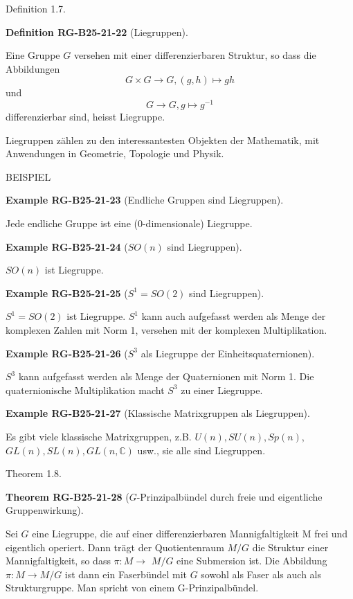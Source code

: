 \documentclass[10pt, letterpaper]{article}
\newcommand{\CustomHeading}[3]{%
  \par\medskip\noindent%
  \textbf{#1 #2} \textnormal{(#3)}.\enskip%
}
\newenvironment{DEF}[2]{\begin{unitbox}\CustomHeading{Definition}{#1}{#2}}{\end{unitbox}}
\newenvironment{THEO}[2]{\begin{unitbox}\CustomHeading{Theorem}{#1}{#2}}{\end{unitbox}}
\newenvironment{EXA}[2]{\begin{unitbox}\CustomHeading{Example}{#1}{#2}}{\end{unitbox}}
\begin{document}
Definition 1.7. 

\begin{DEF}{RG-B25-21-22}{Liegruppen}
Eine Gruppe $G$ versehen mit einer differenzierbaren Struktur, so dass die Abbildungen 
$$G \times G \rightarrow G,(g, h) \mapsto g h$$ und 
$$G \rightarrow G, g \mapsto g^{-1}$$ 
differenzierbar sind, heisst Liegruppe.
\end{DEF}

Liegruppen zählen zu den interessantesten Objekten der Mathematik, mit Anwendungen in Geometrie, Topologie und Physik.

BEISPIEL



\begin{EXA}{RG-B25-21-23}{Endliche Gruppen sind Liegruppen}
Jede endliche Gruppe ist eine (0-dimensionale) Liegruppe.
\end{EXA}


\begin{EXA}{RG-B25-21-24}{$SO(n)$ sind Liegruppen}
$SO(n)$ ist Liegruppe.
\end{EXA}


\begin{EXA}{RG-B25-21-25}{$S^{1}=S O(2)$ sind Liegruppen}
$S^{1}=S O(2)$ ist Liegruppe. $S^{1}$ kann auch aufgefasst werden als Menge der komplexen Zahlen mit Norm 1, versehen mit der komplexen Multiplikation.
\end{EXA}


\begin{EXA}{RG-B25-21-26}{$S^3$ als Liegruppe der Einheitsquaternionen}
$S^{3}$ kann aufgefasst werden als Menge der Quaternionen mit Norm 1. Die quaternionische Multiplikation macht $S^{3}$ zu einer Liegruppe.
\end{EXA}


\begin{EXA}{RG-B25-21-27}{Klassische Matrixgruppen als Liegruppen}
Es gibt viele klassische Matrixgruppen, z.B. $U(n), S U(n), S p(n)$, $G L(n), S L(n), G L(n, \mathbb{C})$ usw., sie alle sind Liegruppen.
\end{EXA}


Theorem 1.8. 

\begin{THEO}{RG-B25-21-28}{$G$-Prinzipalbündel durch freie und eigentliche Gruppenwirkung}
Sei $G$ eine Liegruppe, die auf einer differenzierbaren Mannigfaltigkeit M frei und eigentlich operiert. Dann trägt der Quotientenraum $M / G$ die Struktur einer Mannigfaltigkeit, so dass $\pi: M \rightarrow$ $M / G$ eine Submersion ist. Die Abbildung $\pi: M \rightarrow M / G$ ist dann ein Faserbündel mit $G$ sowohl als Faser als auch als Strukturgruppe. Man spricht von einem G-Prinzipalbündel.
\end{THEO}
\end{document}
